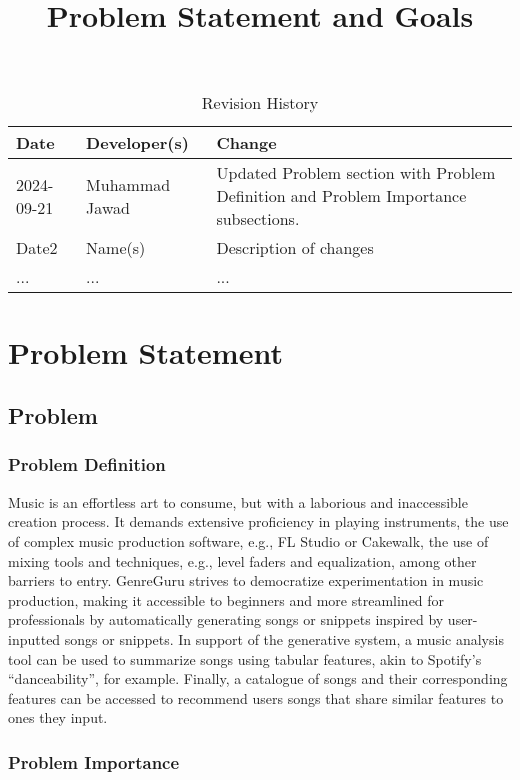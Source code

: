 \documentclass{article}
\title{Problem Statement and Goals\\\progname}
\author{\authname}
\date{}
\begin{document}
\maketitle

\begin{table}[hp]
\caption{Revision History} \label{TblRevisionHistory}
\begin{tabularx}{\textwidth}{llX}
\toprule
\textbf{Date} & \textbf{Developer(s)} & \textbf{Change}\\
\midrule
2024-09-21 & Muhammad Jawad & Updated Problem section with Problem Definition and Problem Importance subsections.\\
Date2 & Name(s) & Description of changes\\
... & ... & ...\\
\bottomrule
\end{tabularx}
\end{table}

\section{Problem Statement}

\subsection{Problem}

\subsubsection{Problem Definition}

Music is an effortless art to consume, but with a laborious and inaccessible creation process. It demands extensive proficiency in playing instruments, the use of complex music production software, e.g., FL Studio or Cakewalk, the use of mixing tools and techniques, e.g., level faders and equalization, among other barriers to entry. GenreGuru strives to democratize experimentation in music production, making it accessible to beginners and more streamlined for professionals by automatically generating songs or snippets inspired by user-inputted songs or snippets. In support of the generative system, a music analysis tool can be used to summarize songs using tabular features, akin to Spotify's ``danceability'', for example. Finally, a catalogue of songs and their corresponding features can be accessed to recommend users songs that share similar features to ones they input.

\subsubsection{Problem Importance}
\end{document}
